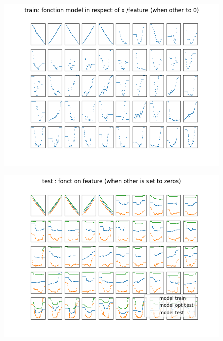 \documentclass{article}
\begin{document}
\newpage


\begin{figure}
\includegraphics[scale=1]{train_affichage_fonction.png}
\end{figure}

\newpage

\begin{figure}
\includegraphics[scale=1]{test_affichage_fonction.png}
\end{figure}

\newpage
\end{document}
